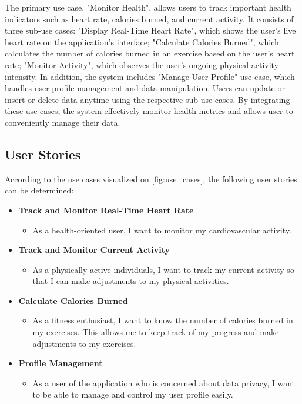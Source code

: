 The primary use case, "Monitor Health", allows users to track important health indicators such as heart rate, calories burned, and current activity. It consists of three sub-use cases: "Display Real-Time Heart Rate", which shows the user's live heart rate on the application's interface; "Calculate Calories Burned", which calculates the number of calories burned in an exercise based on the user's heart rate;  "Monitor Activity", which observes the user's ongoing physical activity intensity. In addition, the system includes "Manage User Profile" use case, which handles user profile management and data manipulation. Users can update or insert or delete data anytime using the respective sub-use cases. By integrating these use cases, the system effectively monitor health metrics and allows user to conveniently manage their data.

\subsection{User Stories}
\label{chap:user_stories}
According to the use cases visualized on \autoref{fig:use_cases}, the following user stories can be determined:

\begin{itemize}[label={},leftmargin=*]
    \item \textbf{Track and Monitor Real-Time Heart Rate}
      \begin{itemize}[label={},leftmargin=*]
        \item As a health-oriented user, I want to monitor my cardiovascular activity.
      \end{itemize}

    \item \textbf{Track and Monitor Current Activity}
      \begin{itemize}[label={},leftmargin=*]
        \item As a physically active individuals, I want to track my current activity so that I can make adjustments to my physical activities.
      \end{itemize}

    \item \textbf{Calculate Calories Burned}
      \begin{itemize}[label={},leftmargin=*]
        \item As a fitness enthusiast, I want to know the number of calories burned in my exercises. This allows me to keep track of my progress and make adjustments to my exercises.
      \end{itemize}  

    \item \textbf{Profile Management}
      \begin{itemize}[label={},leftmargin=*]
        \item As a user of the application who is concerned about data privacy, I want to be able to manage and control my user profile easily. 
      \end{itemize}
  \end{itemize}


